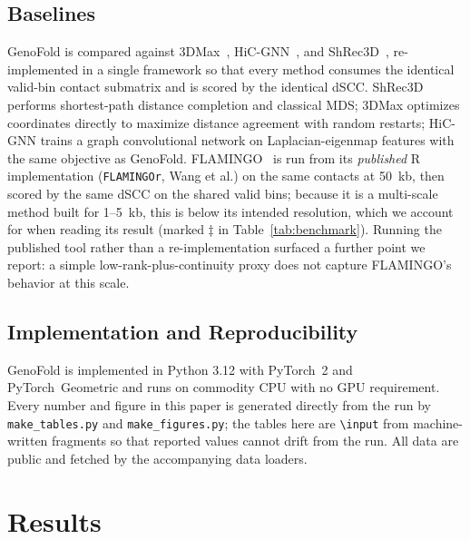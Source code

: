 \documentclass[conference]{IEEEtran}
\begin{document}
\subsection{Baselines}
GenoFold is compared against 3DMax~\cite{oluwadare2018}, HiC-GNN~\cite{hicgnn2022},
and ShRec3D~\cite{lesne2014}, re-implemented in a single framework so that every method
consumes the identical valid-bin contact submatrix and is scored by the identical
dSCC. ShRec3D performs shortest-path distance completion and classical MDS; 3DMax
optimizes coordinates directly to maximize distance agreement with random restarts;
HiC-GNN trains a graph convolutional network on Laplacian-eigenmap features with the
same objective as GenoFold. FLAMINGO~\cite{flamingo2022} is run from its \emph{published}
R implementation (\texttt{FLAMINGOr}, Wang et al.) on the same contacts at 50~kb, then
scored by the same dSCC on the shared valid bins; because it is a multi-scale method
built for 1--5~kb, this is below its intended resolution, which we account for when
reading its result (marked $\ddagger$ in Table~\ref{tab:benchmark}). Running the
published tool rather than a re-implementation surfaced a further point we report: a
simple low-rank-plus-continuity proxy does not capture FLAMINGO's behavior at this
scale.

\subsection{Implementation and Reproducibility}
GenoFold is implemented in Python 3.12 with PyTorch~2 and PyTorch~Geometric and
runs on commodity CPU with no GPU requirement. Every number and figure in this
paper is generated directly from the run by \texttt{make\_tables.py} and
\texttt{make\_figures.py}; the tables here are \texttt{\textbackslash input} from
machine-written fragments so that reported values cannot drift from the run. All
data are public and fetched by the accompanying data loaders.

\section{Results}
\label{sec:results}
\end{document}
